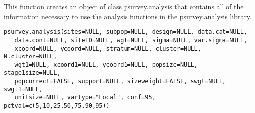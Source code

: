 \begin{Description}\relax
This function creates an object of class psurvey.analysis that contains all 
of the information necessary to use the analysis functions in the 
psurvey.analysis library.
\end{Description}
\begin{Usage}
\begin{verbatim}
psurvey.analysis(sites=NULL, subpop=NULL, design=NULL, data.cat=NULL,
   data.cont=NULL, siteID=NULL, wgt=NULL, sigma=NULL, var.sigma=NULL,
   xcoord=NULL, ycoord=NULL, stratum=NULL, cluster=NULL, N.cluster=NULL,
   wgt1=NULL, xcoord1=NULL, ycoord1=NULL, popsize=NULL, stage1size=NULL,
   popcorrect=FALSE, support=NULL, sizeweight=FALSE, swgt=NULL, swgt1=NULL,
   unitsize=NULL, vartype="Local", conf=95, pctval=c(5,10,25,50,75,90,95))
\end{verbatim}
\end{Usage}

